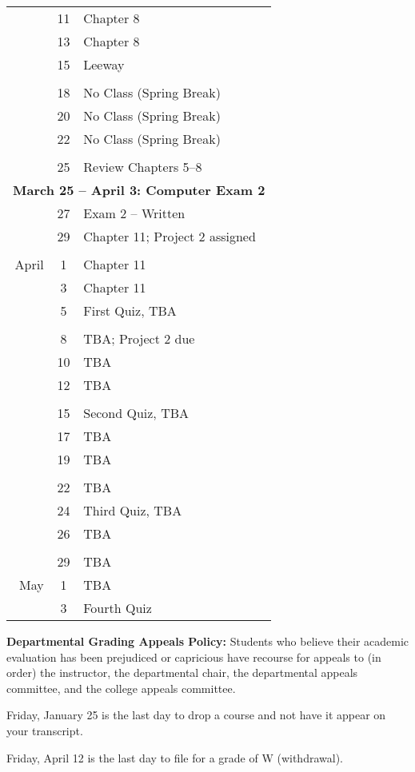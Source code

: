 \documentclass[11pt]{article}
\begin{document}
\phantom{xx}\begin{minipage}[b]{3.25in}
\begin{tabular}{rcl}
\phantom{March}&11 &  Chapter 8 \\
&13 & Chapter 8 \\
&15 & Leeway \\
&&\\
&18 & No Class (Spring Break)\\
&20 & No Class (Spring Break)\\
&22 & No Class (Spring Break)\\
&&\\
&25 & Review Chapters 5--8\\
\multicolumn{3}{l}{\bf March 25 -- April 3: Computer Exam 2}\\
&27 & Exam 2 -- Written\\
&29 & Chapter 11; Project 2 assigned \\
&&\\
April &1 & Chapter 11 \\
&3 & Chapter 11 \\
&5 & First Quiz, TBA \\
&&\\
&8 & TBA; Project 2 due \\
&10 & TBA \\
&12 & TBA \\
&&\\
&15 & Second Quiz, TBA \\
&17 & TBA \\
&19 & TBA \\
&&\\
&22 & TBA \\
&24 & Third Quiz, TBA \\
&26 & TBA \\
&&\\
&29 & TBA \\
May &1 & TBA \\
&3 & Fourth Quiz \\
\end{tabular}
\end{minipage}

\bigskip

{\bf Departmental Grading Appeals Policy: } Students who believe their
academic evaluation has been prejudiced or capricious have recourse
for appeals to (in order) the instructor, the departmental chair, the
departmental appeals committee, and the college appeals committee.

\medskip

Friday, January 25 is the last day to drop a course and not have it
appear on your transcript.

\medskip

Friday, April 12 is the last day to file for a grade of W
(withdrawal).
\end{document}

